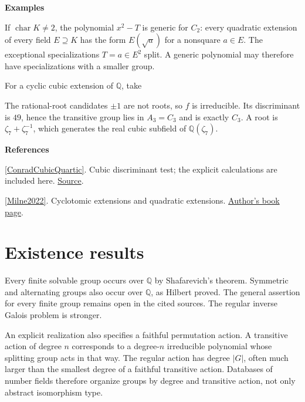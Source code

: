 \documentclass[11pt,a4paper,oneside,openany]{book}
\newcommand{\atlasdisplay}[1]{\par\begingroup\centering\vspace{3pt}\noindent\adjustbox{max width=\linewidth}{\(\displaystyle #1\)}\par\vspace{5pt}\endgroup}
\newenvironment{sources}{\par\smallskip\begingroup\footnotesize\color{atlasgray}\leftskip=10pt\setlength{\parskip}{2pt}}{\par\endgroup\smallskip}
\begin{document}
\begin{atlasblock}[standard]
\textbf{\sffamily Examples}\par\smallskip
\color{black} If \(\operatorname{char}K\ne2\), the polynomial \(x^2-T\) is generic for \(C_2\): every quadratic extension of every field \(E\supseteq K\) has the form \(E(\sqrt a)\) for a nonsquare \(a\in E\). The exceptional specializations \(T=a\in E^2\) split. A generic polynomial may therefore have specializations with a smaller group.\par
\color{black} For a cyclic cubic extension of \(\mathbb Q\), take\par

\atlasdisplay{f=x^3+x^2-2x-1.}
\color{black} The rational-root candidates \(\pm1\) are not roots, so \(f\) is irreducible. Its discriminant is \(49\), hence the transitive group lies in \(A_3=C_3\) and is exactly \(C_3\). A root is \(\zeta_7+\zeta_7^{-1}\), which generates the real cubic subfield of \(\mathbb Q(\zeta_7)\).\par
\end{atlasblock}\color{black}
\begin{sources}
\textbf{References}\par\smallskip
\noindent\hyperlink{ref:ConradCubicQuartic}{[ConradCubicQuartic]}. Cubic discriminant test; the explicit calculations are included here. \href{https://kconrad.math.uconn.edu/blurbs/galoistheory/cubicquartic.pdf}{Source}.\par
\noindent\hyperlink{ref:Milne2022}{[Milne2022]}. Cyclotomic extensions and quadratic extensions. \href{https://www.jmilne.org/math/Books/index.html}{Author's book page}.\par
\end{sources}\color{black}
\section{Existence results}
\color{black} Every finite solvable group occurs over \(\mathbb Q\) by Shafarevich's theorem. Symmetric and alternating groups also occur over \(\mathbb Q\), as Hilbert proved. The general assertion for every finite group remains open in the cited sources. The regular inverse Galois problem is stronger.\par
\color{black} An explicit realization also specifies a faithful permutation action. A transitive action of degree \(n\) corresponds to a degree-\(n\) irreducible polynomial whose splitting group acts in that way. The regular action has degree \(|G|\), often much larger than the smallest degree of a faithful transitive action. Databases of number fields therefore organize groups by degree and transitive action, not only abstract isomorphism type.\par
\end{document}
